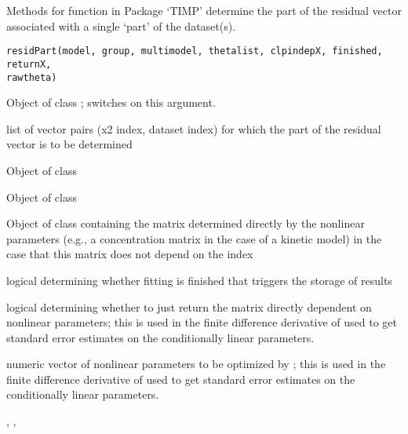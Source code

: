 \begin{Description}\relax
Methods for function  in Package `TIMP' determine the 
part of the residual vector associated with a single `part' of the
dataset(s).
\end{Description}
\begin{Usage}
\begin{verbatim}
residPart(model, group, multimodel, thetalist, clpindepX, finished, returnX,
rawtheta)
\end{verbatim}
\end{Usage}
\begin{Arguments}
\begin{ldescription}
\item[\code{model}] Object of class ; switches on this 
argument. 
\item[\code{group}] list of vector pairs (x2 index, dataset index) for which 
the part of the residual vector is to be determined
\item[\code{multimodel}] Object of class 
\item[\code{thetalist}] Object of class 
\item[\code{clpindepX}] Object of class  containing the matrix
determined directly by the nonlinear parameters (e.g., a concentration matrix
in the case of a kinetic model) in the case that this matrix does not depend
on the  index
\item[\code{finished}] logical determining whether fitting is finished that
triggers the storage of results
\item[\code{returnX}] logical determining whether to just return the matrix 
 directly dependent on nonlinear parameters; this is used in the finite
difference derivative of  used to get standard error estimates on the 
conditionally linear parameters. 
\item[\code{rawtheta}] numeric vector of nonlinear parameters to be optimized 
by ; this is used in the finite
difference derivative of  used to get standard error estimates on the 
conditionally linear parameters.

\end{ldescription}
\end{Arguments}
\begin{SeeAlso}\relax
{}, ,
\end{SeeAlso}

